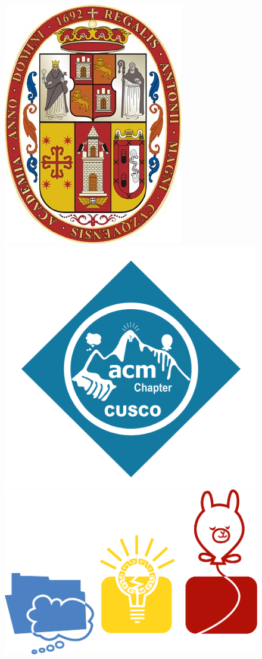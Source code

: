 \clearpage\thispagestyle{empty}

\begin{figure}
    \centering
     \begin{minipage}{.32\textwidth}
        \centering
        \includegraphics[height=.53\linewidth]{images/logo_unsaac.jpg}
    \end{minipage}
    \begin{minipage}{.32\textwidth}
        \centering
        \includegraphics[height=.53\linewidth]{images/logo_acm.png}
    \end{minipage}
        \begin{minipage}{.32\textwidth}
        \centering
        \includegraphics[height=.53\linewidth]{images/logo_cp.png}
    \end{minipage}
\end{figure}


